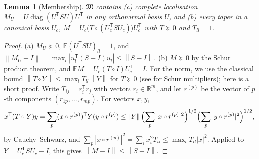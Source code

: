 \documentclass[11pt,a4paper]{article}
\numberwithin{equation}{section}
\newtheorem{lemma}[theorem]{Lemma}
\theoremstyle{remark}\newtheorem{remark}[theorem]{Remark}
\newcommand{\E}{\mathbb E}
\newcommand{\R}{\mathbb R}
\newcommand{\diag}{\operatorname{diag}}
\newcommand{\T}{^{\mathsf T}}
\newcommand{\norm}[1]{\left\lVert#1\right\rVert}
\begin{document}
\begin{lemma}[Membership]\label{lem:membership}
\(\mathfrak M\) contains (a) complete localisation \(M_U=U\diag(U\T SU)U\T\) in any orthonormal
basis \(U\), and (b) every taper in a canonical basis \(U_c\),
\(M=U_c\bigl(T\circ(U_c\T SU_c)\bigr)U_c\T\) with \(T\succeq0\) and \(T_{ll}=1\).
\end{lemma}
\begin{proof}
(a) \(M_U\succeq0\), \(\E(U\T SU)_{ll}=1\), and
\(\norm{M_U-I}=\max_l|u_l\T(S-I)u_l|\le\norm{S-I}\).
(b) \(M\succeq0\) by the Schur product theorem, and \(\E M=U_c(T\circ I)U_c\T=I\). For the norm,
we use the classical bound \(\norm{T\circ Y}\le\max_lT_{ll}\norm Y\) for \(T\succeq0\) (see
\cite{HornJohnson1991} for Schur multipliers); here is a short proof. Write
\(T_{ij}=r_i\T r_j\) with vectors \(r_i\in\R^m\), and let \(r^{(p)}\) be the vector of \(p\)-th
components \((r_{1p},\ldots,r_{mp})\). For vectors \(x,y\),
\[
 x\T(T\circ Y)y=\sum_p(x\circ r^{(p)})\T Y(y\circ r^{(p)})
 \le\norm Y\Bigl(\sum_p|x\circ r^{(p)}|^2\Bigr)^{1/2}\Bigl(\sum_p|y\circ r^{(p)}|^2\Bigr)^{1/2},
\]
by Cauchy--Schwarz, and \(\sum_p|x\circ r^{(p)}|^2=\sum_ix_i^2T_{ii}\le\max_lT_{ll}|x|^2\).
Applied to \(Y=U_c\T SU_c-I\), this gives \(\norm{M-I}\le\norm{S-I}\).
\end{proof}
\end{document}
